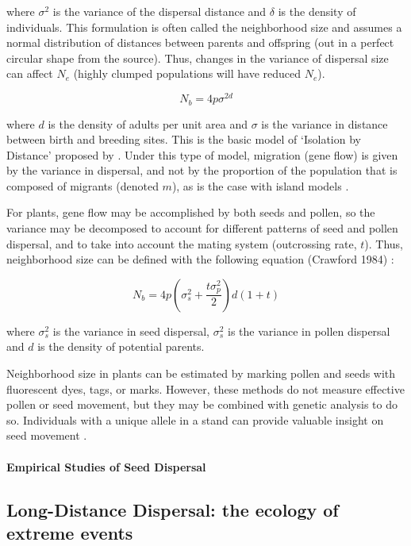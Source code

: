 \documentclass[a4paper, 12pt]{article}
\begin{document}
\begin{linenumbers}
where $\sigma^2$ is the variance of the dispersal distance and $\delta$ is the density of individuals. This formulation is often called the neighborhood size and assumes a normal distribution of distances  between parents and offspring (out in a perfect circular shape from the source). Thus, changes in the variance of dispersal size can affect $N_e$ (highly clumped populations will have reduced $N_e$). 

\begin{equation}
					N_b= 4p \sigma^{2d}
\end{equation}

where $d$ is the density of adults per unit area and $\sigma$ is the variance in distance between birth and breeding sites. This is the basic model of ‘Isolation by Distance’ proposed by   \citet{Wright:1943aa,Wright:1946aa}. Under this type of model, migration (gene flow) is given by the variance in dispersal, and not by the proportion of the population that is composed of migrants (denoted $m$), as is the case with island models \citep{Slatkin:1985qb}.

For plants, gene flow may be accomplished by both seeds and pollen, so the variance may be decomposed to account for different patterns of seed and pollen dispersal, and to take into account the mating system (outcrossing rate, $t$). Thus, neighborhood size can be defined with the following equation (Crawford 1984) :

\begin{equation}
  					N_b = 4p (\sigma^2_s + \frac{t \sigma^2_p}{2}) d (1 + t)
\end{equation}

where $\sigma^2_s$ is the variance in seed dispersal, $\sigma^2_s$ is the variance in pollen dispersal and $d$ is the density of potential parents.

Neighborhood size in plants can be estimated by marking pollen and seeds with fluorescent dyes, tags, or  marks. However, these methods do not measure effective pollen or seed movement, but they may be combined with genetic analysis to do so.  Individuals with a unique allele in a stand can provide valuable insight on seed movement \citep{Eguiarte:1993aa}.


\paragraph*{Empirical Studies of Seed Dispersal}

\subsection*{Long-Distance Dispersal: the ecology of extreme events}


\end{linenumbers}
\end{document}

